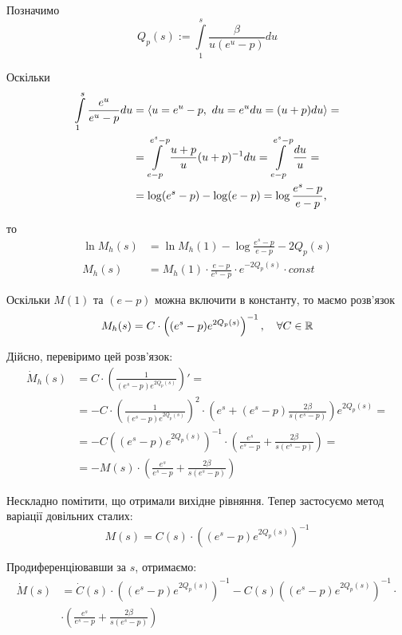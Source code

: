 Позначимо
\begin{equation}
	\label{eq:almost_li_alpha}
	Q_p(s) := \int\limits_1^s \frac{\beta}{u(e^u - p)} du
\end{equation}

Оскільки
\begin{align*}
	\int\limits_1^s \frac{e^u}{e^u - p} du &= \langle u = e^u - p,~ du = e^u du = (u+p) du \rangle = \\
	&= \int\limits_{e-p}^{e^s -p} \frac{u + p}{u} (u+p)^{-1} du = 
	\int\limits_{e-p}^{e^s -p} \frac{du}{u} = \\
	&= \log(e^s - p) - \log(e-p) = \log \frac{e^s - p}{e - p} \text{,}
\end{align*}

то
\begin{align*}
	\ln{M_h (s)} &= \ln{M_h (1)} - \log \frac{e^s - p}{e - p} - 2Q_p(s) \\
	M_h (s) &= M_h (1) \cdot \frac{e - p}{e^s - p} \cdot e^{- 2Q_p(s)} \cdot const
\end{align*}

Оскільки $M(1)$ та $(e-p)$ можна включити в константу, то маємо розв'язок
\begin{equation}
	\label{eq:uniform_right_laplace_homogen_sol}
	M_h (s) = C \cdot \left((e^s - p)  e^{2Q_p(s)}\right)^{-1}, \quad \forall C \in \mathbb{R}
\end{equation}

Дійсно, перевіримо цей розв'язок:
\[
\begin{split}
	\dot M_h (s) &= C \cdot \left(\frac{1}{(e^s - p)  e^{2Q_p(s)}}\right)'=\\
	 &= - C \cdot \left(\frac{1}{(e^s - p)  e^{2Q_p(s)}}\right)^2 \cdot \left(e^s  + (e^s - p) \frac{2\beta}{s(e^s - p)}   \right) e^{2Q_p(s)} =\\
	 &= -C \left((e^s - p)  e^{2Q_p(s)}\right)^{-1} \cdot \left(\frac{e^s}{e^s - p}  + \frac{2\beta}{s(e^s - p)}   \right) =\\
	 &= - M(s) \cdot \left(\frac{e^s}{e^s - p}  + \frac{2\beta}{s(e^s - p)}   \right)
\end{split}
\]

Нескладно помітити, що отримали вихідне рівняння. Тепер застосуємо метод варіації довільних сталих:
$$
	M(s) = C(s) \cdot \left((e^s - p)  e^{2Q_p(s)}\right)^{-1} 
$$

Продиференціювавши за $s$, отримаємо:
\begin{align*}
	\dot M(s) &= \dot C(s) \cdot \left((e^s - p)  e^{2Q_p(s)}\right)^{-1} -C(s) \left((e^s - p)  e^{2Q_p(s)}\right)^{-1} \cdot \\
	&\cdot \left(\frac{e^s}{e^s - p}  + \frac{2\beta}{s(e^s - p)}   \right) 
\end{align*}

